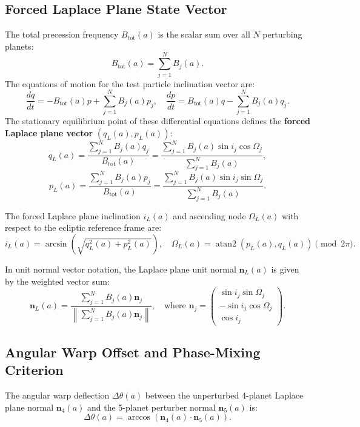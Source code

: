 \documentclass[11pt,a4paper]{article}
\begin{document}
\subsection{Forced Laplace Plane State Vector}
The total precession frequency $B_{\text{tot}}(a)$ is the scalar sum over all $N$ perturbing planets:
\begin{equation}
B_{\text{tot}}(a) = \sum_{j=1}^N B_j(a).
\end{equation}
The equations of motion for the test particle inclination vector are:
\begin{equation}
\frac{dq}{dt} = -B_{\text{tot}}(a) p + \sum_{j=1}^N B_j(a) p_j, \quad \frac{dp}{dt} = B_{\text{tot}}(a) q - \sum_{j=1}^N B_j(a) q_j.
\end{equation}
The stationary equilibrium point of these differential equations defines the \textbf{forced Laplace plane vector} $(q_L(a), p_L(a))$:
\begin{equation}
q_L(a) = \frac{\sum_{j=1}^N B_j(a) q_j}{B_{\text{tot}}(a)} = \frac{\sum_{j=1}^N B_j(a) \sin i_j \cos \Omega_j}{\sum_{j=1}^N B_j(a)},
\end{equation}
\begin{equation}
p_L(a) = \frac{\sum_{j=1}^N B_j(a) p_j}{B_{\text{tot}}(a)} = \frac{\sum_{j=1}^N B_j(a) \sin i_j \sin \Omega_j}{\sum_{j=1}^N B_j(a)}.
\end{equation}

The forced Laplace plane inclination $i_L(a)$ and ascending node $\Omega_L(a)$ with respect to the ecliptic reference frame are:
\begin{equation}
i_L(a) = \arcsin\left( \sqrt{q_L^2(a) + p_L^2(a)} \right), \quad \Omega_L(a) = \operatorname{atan2}\left( p_L(a), q_L(a) \right) \pmod{2\pi}.
\end{equation}

In unit normal vector notation, the Laplace plane unit normal $\mathbf{n}_L(a)$ is given by the weighted vector sum:
\begin{equation}
\mathbf{n}_L(a) = \frac{\sum_{j=1}^N B_j(a) \mathbf{n}_j}{\left\| \sum_{j=1}^N B_j(a) \mathbf{n}_j \right\|}, \quad \text{where } \mathbf{n}_j = \begin{pmatrix} \sin i_j \sin \Omega_j \\ -\sin i_j \cos \Omega_j \\ \cos i_j \end{pmatrix}.
\end{equation}

\subsection{Angular Warp Offset and Phase-Mixing Criterion}
The angular warp deflection $\Delta\theta(a)$ between the unperturbed 4-planet Laplace plane normal $\mathbf{n}_4(a)$ and the 5-planet perturber normal $\mathbf{n}_5(a)$ is:
\begin{equation}
\Delta\theta(a) = \arccos\left( \mathbf{n}_4(a) \cdot \mathbf{n}_5(a) \right).
\end{equation}
\end{document}
